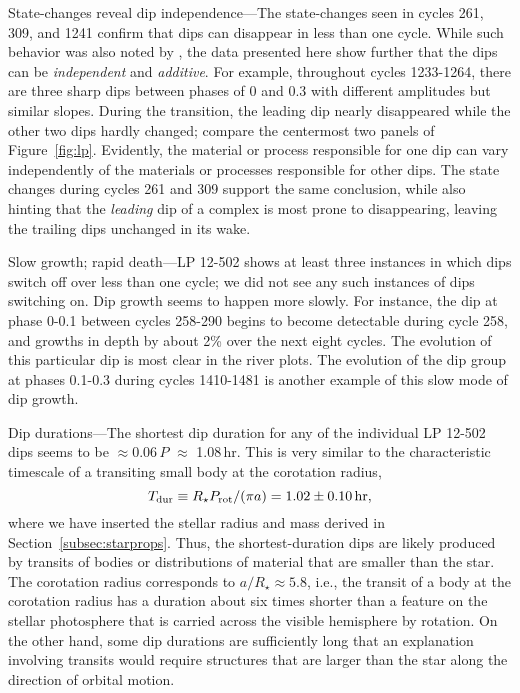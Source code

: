 \documentclass[11pt,twocolumn,tighten,linenumbers]{aastex63}
\begin{document}
{\sc State-changes reveal dip independence}---The state-changes seen
in cycles 261, 309, and 1241 confirm that dips can disappear in less
than one cycle. While such behavior was also noted by
\cite{2017AJ....153..152S}, the data presented here show further that
the dips can be {\it independent} and {\it additive}.  For example,
throughout cycles 1233-1264, there are three sharp dips between phases
of 0 and 0.3 with different amplitudes but similar slopes.  During the
transition, the leading dip nearly disappeared while the other two
dips hardly changed; compare the centermost two panels of
Figure~\ref{fig:lp}.  Evidently, the material or process responsible
for one dip can vary independently of the materials or processes
responsible for other dips.  The state changes during cycles 261 and
309 support the same conclusion, while also hinting that the {\it
leading} dip of a complex is most prone to disappearing, leaving the
trailing dips unchanged in its wake.


{\sc Slow growth; rapid death}---LP 12-502 shows at least three
instances in which dips switch off over less than one cycle; we did
not see any such instances of dips switching on.  Dip growth seems to
happen more slowly.  For instance, the dip at phase 0-0.1 between
cycles 258-290 begins to become detectable during cycle 258, and
growths in depth by about 2\% over the next eight cycles.  The
evolution of this particular dip is most clear in the river plots.
The evolution of the dip group at phases 0.1-0.3 during cycles
1410-1481 is another example of this slow mode of dip growth.

{\sc Dip durations}---The shortest dip duration for any of the
individual LP 12-502 dips seems to be $\approx$0.06\,$P$ $\approx$
1.08\,hr.  This is very similar to the characteristic timescale of a
transiting small body at the corotation radius,
\begin{equation}
T_{\rm dur} \equiv R_\star P_{\rm rot} / (\pi a) = 1.02\pm 0.10\,{\rm hr},
\end{equation}
where we have inserted the stellar radius and mass derived in
Section~\ref{subsec:starprops}.  Thus, the shortest-duration dips are
likely produced by transits of bodies or distributions of material
that are smaller than the star.  The corotation radius corresponds to
$a/R_\star \approx 5.8$, i.e., the transit of a body at the corotation
radius has a duration about six times shorter than a feature on the
stellar photosphere that is carried across the visible hemisphere by
rotation.  On the other hand, some dip durations are sufficiently long
that an explanation involving transits would require structures that
are larger than the star along the direction of orbital motion.
\end{document}
